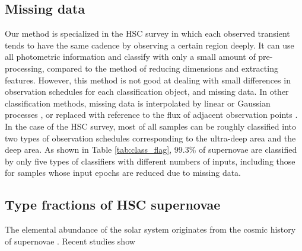 \documentclass[useamsfonts]{pasj01}
\begin{document}
\subsection{Missing data}
%
Our method is specialized in the HSC survey in which each observed transient tends to have the same cadence by observing a certain region deeply.
It can use all photometric information and classify with only a small amount of pre-processing, compared to the method of reducing dimensions and extracting features. 
However, this method is not good at dealing with small differences in observation schedules for each classification object, and missing data.
In other classification methods, missing data is interpolated by linear or Gaussian processes \citep{lockner16a,Muthukrishna_2019}, or replaced with reference to the flux of adjacent observation points \citep{charnock17a}.
In the case of the HSC survey, most of all samples can be roughly classified into two types of observation schedules corresponding to the ultra-deep area and the deep area.
As shown in Table \ref{tab:class_flag}, 99.3\% of supernovae are classified by only five types of classifiers with different numbers of inputs, including those for samples whose input epochs are reduced due to missing data.
%

\subsection{Type fractions of HSC supernovae}
The elemental abundance of the solar system \citep{grevesse98a} originates from the cosmic history of 
supernovae \citep{kobayashi00a}.  
Recent studies show
\end{document}
